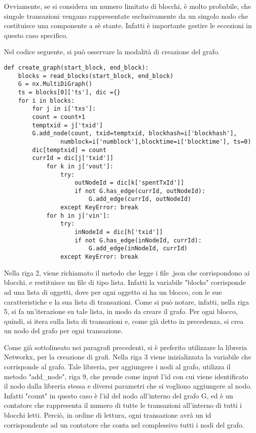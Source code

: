 Ovviamente, se si considera un numero limitato di blocchi, è molto probabile, che singole transazioni vengano rappresentate esclusivamente da un singolo nodo che costituisce una componente a sè stante. Infatti è importante gestire le eccezioni in questo caso specifico.

Nel codice seguente, si può osservare la modalità di creazione del grafo.


\begin{lstlisting}[basicstyle=\tiny]
def create_graph(start_block, end_block):
	blocks = read_blocks(start_block, end_block)	
	G = nx.MultiDiGraph()
	ts = blocks[0]['ts'], dic ={}
	for i in blocks:
		for j in i['txs']:
		count = count+1
		temptxid = j['txid']
		G.add_node(count, txid=temptxid, blockhash=i['blockhash'], 
				numblock=i['numblock'],blocktime=i['blocktime'], ts=0)
		dic[temptxid] = count
		currId = dic[j['txid']]
			for k in j['vout']:
				try:
					outNodeId = dic[k['spentTxId']]	
					if not G.has_edge(currId, outNodeId):
						G.add_edge(currId, outNodeId)
				except KeyError: break	
			for h in j['vin']:
				try:
					inNodeId = dic[h['txid']]
					if not G.has_edge(inNodeId, currId):
						G.add_edge(inNodeId, currId)
				except KeyError: break	
\end{lstlisting}

Nella riga 2, viene richiamato il metodo che legge i file .json che corrispondono ai blocchi, e restituisce un file di tipo lista. Infatti la variabile "blocks" corrisponde ad una lista di oggetti, dove per ogni oggetto si ha un blocco, con le sue caratteristiche e la sua lista di transazioni. Come si può notare, infatti, nella riga 5, si fa un'iterazione su tale lista, in modo da creare il grafo. Per ogni blocco, quindi, si itera sulla lista di transazioni e, come già detto in precedenza, si crea un nodo del grafo per ogni transazione. 

Come già sottolineato nei paragrafi precedenti, si è preferito utilizzare la libreria Networkx, per la creazione di grafi. Nella riga 3 viene inizializzata la variabile che corrisponde al grafo. Tale libreria, per aggiungere i nodi al grafo, utilizza il metodo "add_node", riga 9, che prende come input l'id con cui viene identificato il nodo dalla libreria stessa e diversi parametri che si vogliono aggiungere al nodo. Infatti "count" in questo caso è l'id del nodo all'interno del grafo G, ed è un contatore che rappresenta il numero di tutte le transazioni all'interno di tutti i blocchi letti. Perciò, in ordine di lettura, ogni transazione avrà un id corrispondente ad un contatore che conta nel complessivo tutti i nodi del grafo.

